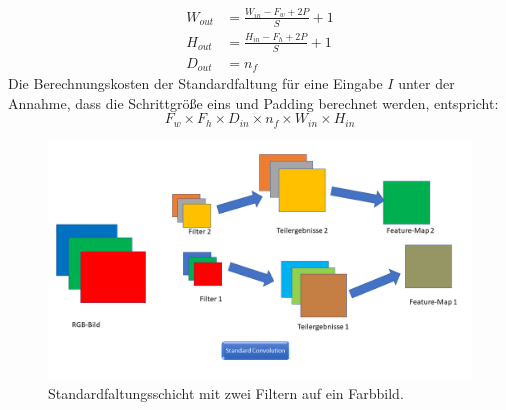 \documentclass[12pt,a4paper]{scrartcl}
\numberwithin{equation}{section}
\begin{document}
\begin{equation}\label{eq:outputSize}
	 \begin{split}
	W_{out} &= \frac{W_{in}-F_w+2P}{S}+1\\
	H_{out} &= \frac{H_{in}-F_h+2P}{S}+1\\
	D_{out} &= n_f 
	\end{split} 
\end{equation}
Die Berechnungskosten der Standardfaltung für eine Eingabe $ I $ unter der Annahme, dass die Schrittgröße eins und Padding berechnet werden, entspricht:
\begin{equation}\label{eq:SF_kost}
	F_w\times F_h \times D_{in}\times n_f \times W_{in}\times H_{in}
\end{equation}
\begin{figure}[h]
	\includegraphics[width=\textwidth]{Convolution/Folie1}
	\caption{Standardfaltungsschicht mit zwei Filtern auf ein Farbbild.}
	\label{fig:Standardfaltung}
\end{figure}
\end{document}
